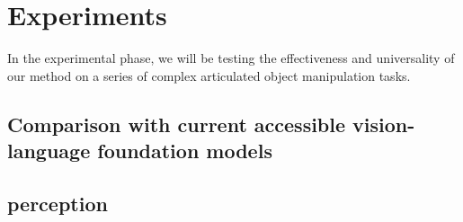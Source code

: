 \section{Experiments}
In the experimental phase, we will be testing the effectiveness and universality of our method on a series of complex articulated object manipulation tasks.


\subsection{Comparison with current accessible vision-language foundation models}

\subsection{perception}


